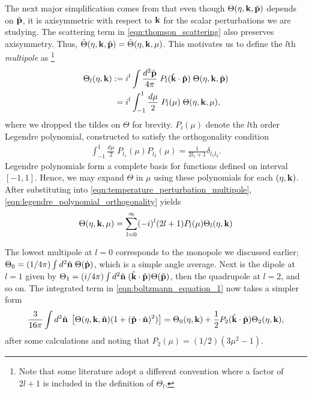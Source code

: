 The next major simplification comes from that even though $\Theta(\eta,\mathbf{k},\hat{\mathbf{p}})$ depends on $\hat{\mathbf{p}}$, it is axisymmetric with respect to $\mathbf{k}$ for the scalar perturbations we are studying. The scattering term in \eqref{eqn:thomson_scattering} also preserves axisymmetry. Thus, $\tilde{\Theta}(\eta,\mathbf{k},\hat{\mathbf{p}}) = \tilde{\Theta}(\eta,\mathbf{k},\mu)$. This motivates us to define the $l$th \textit{multipole} as \footnote{Note that some literature adopt a different convention where a factor of $2l+1$ is included in the definition of $\Theta_l$.}
\begin{align}
	\Theta_l (\eta,\mathbf{k}) :=& \; i^l \int \frac{d^2 \hat{\mathbf{p}}}{4\pi} \; P_l (\hat{\mathbf{k}} \cdot \hat{\mathbf{p}}) \; \Theta(\eta, \mathbf{k}, \hat{\mathbf{p}}) \\
	=& \; i^l \int^1_{-1} \frac{d\mu}{2} \; P_l (\mu) \; \Theta(\eta, \mathbf{k}, \mu), \label{eqn:temperature_perturbation_multipole} 
\end{align}
where we dropped the tildes on $\Theta$ for brevity. $P_l(\mu)$ denote the $l$th order Legendre polynomial, constructed to satisfy the orthogonality condition
\begin{align}
	\int_{-1}^{1} \frac{d\mu}{2} \; P_{l_1}(\mu) P_{l_2}(\mu) = \frac{1}{2l_1 + 1} \delta_{l_1 l_2}. \label{eqn:legendre_polynomial_orthogonality}
\end{align}
Legendre polynomials form a complete basis for functions defined on interval $[-1,1]$. Hence, we may expand $\Theta$ in $\mu$ using these polynomials for each $(\eta,\mathbf{k})$. After substituting into \eqref{eqn:temperature_perturbation_multipole}, \eqref{eqn:legendre_polynomial_orthogonality} yields
\begin{align}
	\Theta(\eta,\mathbf{k},\mu) = \sum_{l=0}^{\infty} (-i)^l (2l+1) P_l (\mu) \Theta_l (\eta, \mathbf{k}) \label{eqn:temperature_perturbation_legendre_expansion}
\end{align}

The lowest multipole at $l=0$ corresponds to the monopole we discussed earlier; $\Theta_0 = (1/4\pi) \int d^2\hat{\mathbf{n}} \; \Theta(\hat{\mathbf{p}})$, which is a simple angle average. Next is the dipole at $l=1$ given by $\Theta_1 = (i/4\pi) \int d^2\hat{\mathbf{n}} \; (\hat{\mathbf{k}} \cdot \hat{\mathbf{p}}) \Theta(\hat{\mathbf{p}})$, then the quadrupole at $l=2$, and so on. The integrated term in \eqref{eqn:boltzmann_equation_1} now takes a simpler form
\begin{align}
	\frac{3}{16\pi} \int d^2\hat{\mathbf{n}} \; \left[ \Theta(\eta,\mathbf{k},\hat{\mathbf{n}}) (1 + (\hat{\mathbf{p}} \cdot \hat{\mathbf{n}})^2) \right] = \Theta_0 (\eta,\mathbf{k}) + \frac{1}{2} P_2 (\hat{\mathbf{k}} \cdot \hat{\mathbf{p}}) \Theta_2(\eta, \mathbf{k}), 
\end{align}
after some calculations and noting that $P_2(\mu) = (1/2)(3\mu^2 -1)$.

